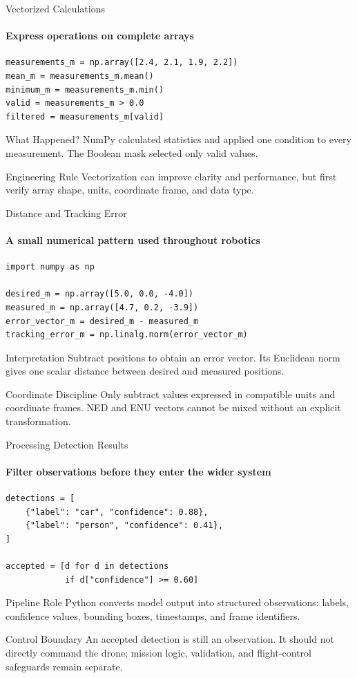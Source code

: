 \begin{frame}[fragile]{Vectorized Calculations}
\framesubtitle{Express operations on complete arrays}
\begin{verbatim}
measurements_m = np.array([2.4, 2.1, 1.9, 2.2])
mean_m = measurements_m.mean()
minimum_m = measurements_m.min()
valid = measurements_m > 0.0
filtered = measurements_m[valid]
\end{verbatim}
\begin{exampleblock}{What Happened?}
NumPy calculated statistics and applied one condition to every measurement. The Boolean mask selected only valid values.
\end{exampleblock}
\begin{block}{Engineering Rule}
Vectorization can improve clarity and performance, but first verify array shape, units, coordinate frame, and data type.
\end{block}
\end{frame}

\begin{frame}[fragile]{Distance and Tracking Error}
\framesubtitle{A small numerical pattern used throughout robotics}
\begin{verbatim}
import numpy as np

desired_m = np.array([5.0, 0.0, -4.0])
measured_m = np.array([4.7, 0.2, -3.9])
error_vector_m = desired_m - measured_m
tracking_error_m = np.linalg.norm(error_vector_m)
\end{verbatim}
\begin{block}{Interpretation}
Subtract positions to obtain an error vector. Its Euclidean norm gives one scalar distance between desired and measured positions.
\end{block}
\begin{alertblock}{Coordinate Discipline}
Only subtract values expressed in compatible units and coordinate frames. NED and ENU vectors cannot be mixed without an explicit transformation.
\end{alertblock}
\end{frame}

\begin{frame}[fragile]{Processing Detection Results}
\framesubtitle{Filter observations before they enter the wider system}
\begin{verbatim}
detections = [
    {"label": "car", "confidence": 0.88},
    {"label": "person", "confidence": 0.41},
]

accepted = [d for d in detections
            if d["confidence"] >= 0.60]
\end{verbatim}
\begin{block}{Pipeline Role}
Python converts model output into structured observations: labels, confidence values, bounding boxes, timestamps, and frame identifiers.
\end{block}
\begin{alertblock}{Control Boundary}
An accepted detection is still an observation. It should not directly command the drone; mission logic, validation, and flight-control safeguards remain separate.
\end{alertblock}
\end{frame}

